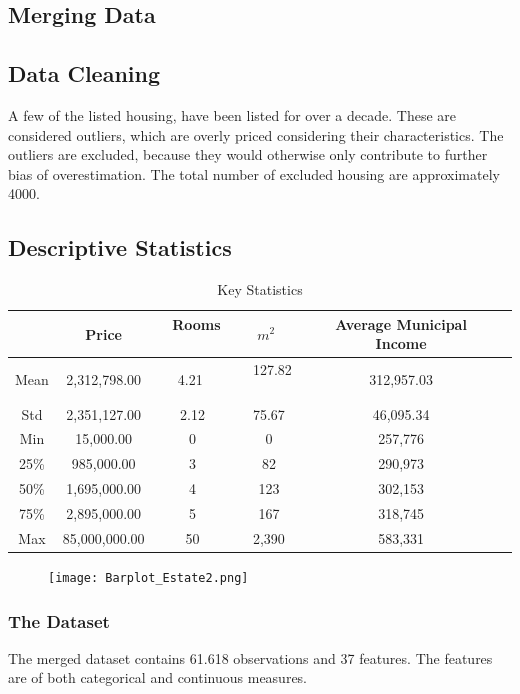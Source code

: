 \documentclass[12pt,a4paper]{article}
\begin{document}
\subsection{Merging Data}

\subsection{Data Cleaning}

A few of the listed housing, have been listed for over a decade. These are considered outliers, which are overly priced considering their characteristics. The outliers are excluded, because they would otherwise only contribute to further bias of overestimation. The total number of excluded housing are approximately 4000.  

\subsection{Descriptive Statistics}
\begin{table}[h!]
\begin{center}
\caption{Key Statistics\label{time}}
\begin{tabular}{| c | c | c | c | c | c |} 
\hline
   & Price & \, Rooms \ & \ $m^2$ \ & Average Municipal Income \\ \hline
   Mean & 2,312,798.00 & \ 4.21 \  & \ 127.82 \ & 312,957.03 \\ \hline
   Std & 2,351,127.00 & 2.12 & 75.67 & 46,095.34 \\ \hline
   Min & 15,000.00 & 0 & 0 & 257,776 \\ \hline
   25\% & 985,000.00 & 3 & 82 & 290,973 \\ \hline
   50\% & 1,695,000.00 & 4 & 123 & 302,153 \\ \hline
   75\% & 2,895,000.00 & 5 & 167 & 318,745 \\ \hline
   Max & 85,000,000.00 & 50 & 2,390 & 583,331 \\ \hline
\end{tabular}
\end{center}
\end{table} 
\begin{figure}[H]
  \centering
   \caption{}
   \texttt{[image: Barplot\_Estate2.png]} 
  \label{fig:}
\end{figure}




\subsubsection{The Dataset}
The merged dataset contains 61.618 observations and 37 features.   The features are of both categorical and continuous measures. \newline 
\end{document}
